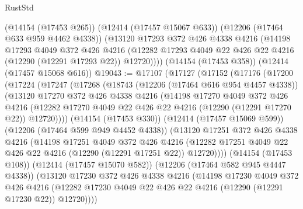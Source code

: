 \begin{lexlean}{RustStd}
\begin{coremodule}
      (@14154 (@17453 @265))
      (@12414 (@17457 @15067 @633))
      (@12206 (@17464 @633 @959 @4462 @4338))
      (@13120
        @17293
        @372
        @426
        @4338
        @4216
        (@14198
          @17293
          @4049
          @372
          @426
          @4216
          (@12282 @17293 @4049 @22 @426 @22 @4216 (@12290 (@12291 @17293 @22)) @12720))))
    (@14154 (@17453 @358))
    (@12414 (@17457 @15068 @616))
@19043 := @17107
    (@17127
      (@17152
        (@17176
          (@17200
            (@17224
              (@17247
                (@17268
                  (@18743
                    (@12206 (@17464 @616 @954 @4457 @4338))
                    (@13120
                      @17270
                      @372
                      @426
                      @4338
                      @4216
                      (@14198
                        @17270
                        @4049
                        @372
                        @426
                        @4216
                        (@12282
                          @17270
                          @4049
                          @22
                          @426
                          @22
                          @4216
                          (@12290 (@12291 @17270 @22))
                          @12720))))
                  (@14154 (@17453 @330))
                  (@12414 (@17457 @15069 @599))
                  (@12206 (@17464 @599 @949 @4452 @4338))
                  (@13120
                    @17251
                    @372
                    @426
                    @4338
                    @4216
                    (@14198
                      @17251
                      @4049
                      @372
                      @426
                      @4216
                      (@12282
                        @17251
                        @4049
                        @22
                        @426
                        @22
                        @4216
                        (@12290 (@12291 @17251 @22))
                        @12720))))
                (@14154 (@17453 @108))
                (@12414 (@17457 @15070 @582))
                (@12206 (@17464 @582 @945 @4447 @4338))
                (@13120
                  @17230
                  @372
                  @426
                  @4338
                  @4216
                  (@14198
                    @17230
                    @4049
                    @372
                    @426
                    @4216
                    (@12282 @17230 @4049 @22 @426 @22 @4216 (@12290 (@12291 @17230 @22)) @12720))))

\end{coremodule}
\end{lexlean}

